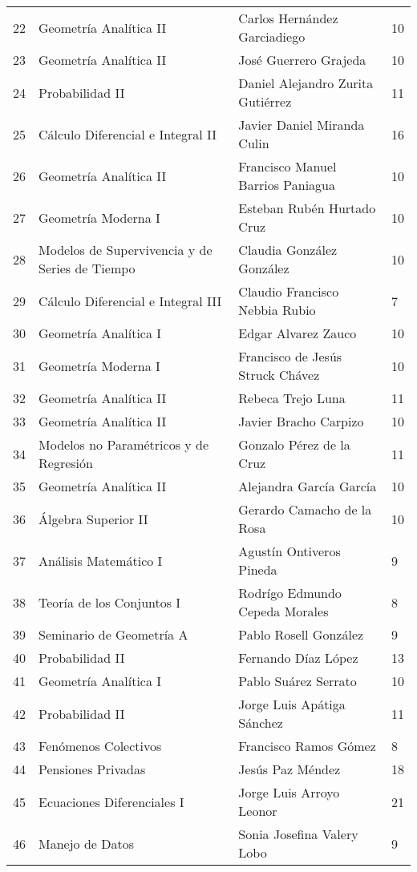 \begin{table}[ht]
\begin{tabular}{rlll}
  22 & Geometría Analítica II & Carlos Hernández Garciadiego & 10 \\ 
  23 & Geometría Analítica II & José Guerrero Grajeda & 10 \\ 
  24 & Probabilidad II & Daniel Alejandro Zurita Gutiérrez & 11 \\ 
  25 & Cálculo Diferencial e Integral II & Javier Daniel Miranda Culin & 16 \\ 
  26 & Geometría Analítica II & Francisco Manuel Barrios Paniagua & 10 \\ 
  27 & Geometría Moderna I & Esteban Rubén Hurtado Cruz & 10 \\ 
  28 & Modelos de Supervivencia y de Series de Tiempo & Claudia González González & 10 \\ 
  29 & Cálculo Diferencial e Integral III & Claudio Francisco Nebbia Rubio & 7 \\ 
  30 & Geometría Analítica I & Edgar Alvarez Zauco & 10 \\ 
  31 & Geometría Moderna I & Francisco de Jesús Struck Chávez & 10 \\ 
  32 & Geometría Analítica II & Rebeca Trejo Luna & 11 \\ 
  33 & Geometría Analítica II & Javier Bracho Carpizo & 10 \\ 
  34 & Modelos no Paramétricos y de Regresión & Gonzalo Pérez de la Cruz & 11 \\ 
  35 & Geometría Analítica II & Alejandra García García & 10 \\ 
  36 & Álgebra Superior II & Gerardo Camacho de la Rosa & 10 \\ 
  37 & Análisis Matemático I & Agustín Ontiveros Pineda & 9 \\ 
  38 & Teoría de los Conjuntos I & Rodrígo Edmundo Cepeda Morales & 8 \\ 
  39 & Seminario de Geometría A & Pablo Rosell González & 9 \\ 
  40 & Probabilidad II & Fernando Díaz López & 13 \\ 
  41 & Geometría Analítica I & Pablo Suárez Serrato & 10 \\ 
  42 & Probabilidad II & Jorge Luis Apátiga Sánchez & 11 \\ 
  43 & Fenómenos Colectivos & Francisco Ramos Gómez & 8 \\ 
  44 & Pensiones Privadas & Jesús Paz Méndez & 18 \\ 
  45 & Ecuaciones Diferenciales I & Jorge Luis Arroyo Leonor & 21 \\ 
  46 & Manejo de Datos & Sonia Josefina Valery Lobo & 9 \\ 

\end{tabular}
\end{table}
